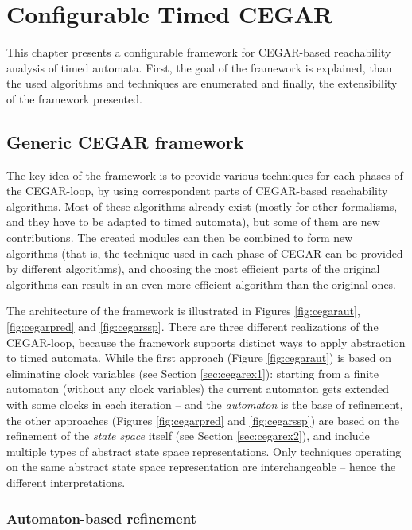 \chapter{Configurable Timed CEGAR} \label{chap:timed_cegar}

This chapter presents a configurable framework for CEGAR-based reachability analysis of timed automata. First, the goal of the framework is explained, than the used algorithms and techniques are enumerated and finally, the extensibility of the framework presented. 

\section{Generic CEGAR framework}

The key idea of the framework is to provide various techniques for each phases of the CEGAR-loop, by using correspondent parts of CEGAR-based reachability algorithms. Most of these algorithms already exist (mostly for other formalisms, and they have to be adapted to timed automata), but some of them are new contributions. The created modules can then be combined to form new algorithms (that is, the technique used in each phase of CEGAR can be provided by different algorithms), and choosing the most efficient parts of the original algorithms can result in an even more efficient algorithm than the original ones. 

The architecture of the framework is illustrated in Figures \ref{fig:cegaraut}, \ref{fig:cegarpred} and \ref{fig:cegarssp}. There are three different realizations of the CEGAR-loop, because the framework supports distinct ways to apply abstraction to timed automata. While the first approach (Figure \ref{fig:cegaraut}) is based on eliminating clock variables (see Section \ref{sec:cegarex1}):  starting from a finite automaton (without any clock variables) the current automaton gets extended with some clocks in each iteration -- and the \emph{automaton} is the base of refinement, the other approaches (Figures \ref{fig:cegarpred} and \ref{fig:cegarssp}) are based on the refinement of the \emph{state space} itself (see Section \ref{sec:cegarex2}), and include multiple types of abstract state space representations. Only techniques operating on the same abstract state space representation are interchangeable -- hence the different interpretations.

\subsection{Automaton-based refinement}

